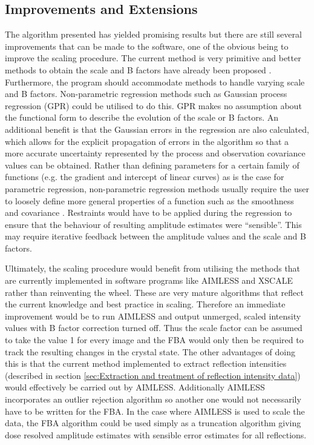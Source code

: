 \subsection{Improvements and Extensions}
\label{sub:Improvements and Extensions}
The algorithm presented has yielded promising results but there are still several improvements that can be made to the software, one of the obvious being to improve the scaling procedure.
The current method is very primitive and better methods to obtain the scale and B factors have already been proposed \cite{popov2003}.
Furthermore, the program should accommodate methods to handle varying scale and B factors.
Non-parametric regression methods such as Gaussian process regression (GPR) could be utilised to do this.
GPR makes no assumption about the functional form to describe the evolution of the scale or B factors.
An additional benefit is that the Gaussian errors in the regression are also calculated, which allows for the explicit propagation of errors in the algorithm so that a more accurate uncertainty represented by the process and observation covariance values can be obtained.
Rather than defining parameters for a certain family of functions (e.g. the gradient and intercept of linear curves) as is the case for parametric regression, non-parametric regression methods usually require the user to loosely define more general properties of a function such as the smoothness and covariance \cite{rasmussen2006gaussian}.
Restraints would have to be applied during the regression to ensure that the behaviour of resulting amplitude estimates were ``sensible''.
This may require iterative feedback between the amplitude values and the scale and B factors.

Ultimately, the scaling procedure would benefit from utilising the methods that are currently implemented in software programs like AIMLESS and XSCALE rather than reinventing the wheel.
These are very mature algorithms that reflect the current knowledge and best practice in scaling.
Therefore an immediate improvement would be to run AIMLESS and output unmerged, scaled intensity values with B factor correction turned off.
Thus the scale factor can be assumed to take the value 1 for every image and the FBA would only then be required to track the resulting changes in the crystal state.
The other advantages of doing this is that the current method implemented to extract reflection intensities (described in section \ref{sec:Extraction and treatment of reflection intensity data}) would effectively be carried out by AIMLESS.
Additionally AIMLESS incorporates an outlier rejection algorithm so another one would not necessarily have to be written for the FBA.
In the case where AIMLESS is used to scale the data, the FBA algorithm could be used simply as a truncation algorithm giving dose resolved amplitude estimates with sensible error estimates for all reflections.

